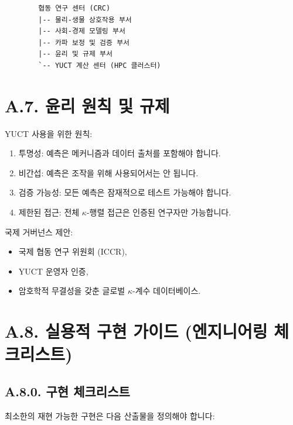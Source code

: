 \documentclass[13pt,a4paper]{article}
\begin{document}
	\begin{lstlisting}
		협동 연구 센터 (CRC)
		|-- 물리-생물 상호작용 부서
		|-- 사회-경제 모델링 부서
		|-- 카파 보정 및 검증 부서
		|-- 윤리 및 규제 부서
		`-- YUCT 계산 센터 (HPC 클러스터)
	\end{lstlisting}
	
	\section*{A.7. 윤리 원칙 및 규제}
	
	YUCT 사용을 위한 원칙:
	\begin{enumerate}[leftmargin=*]
		\item 투명성: 예측은 메커니즘과 데이터 출처를 포함해야 합니다.
		\item 비간섭: 예측은 조작을 위해 사용되어서는 안 됩니다.
		\item 검증 가능성: 모든 예측은 잠재적으로 테스트 가능해야 합니다.
		\item 제한된 접근: 전체 $\kappa$-행렬 접근은 인증된 연구자만 가능합니다.
	\end{enumerate}
	
	국제 거버넌스 제안:
	\begin{itemize}[leftmargin=*]
		\item 국제 협동 연구 위원회 (ICCR),
		\item YUCT 운영자 인증,
		\item 암호학적 무결성을 갖춘 글로벌 $\kappa$-계수 데이터베이스.
	\end{itemize}
	
	\section*{A.8. 실용적 구현 가이드 (엔지니어링 체크리스트)}
	
	\subsection*{A.8.0. 구현 체크리스트}
	최소한의 재현 가능한 구현은 다음 산출물을 정의해야 합니다:
	
\end{document}
